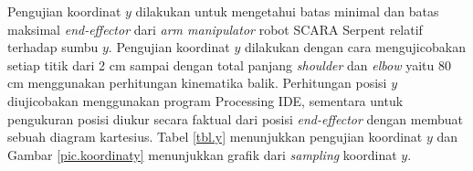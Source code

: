 Pengujian koordinat $y$ dilakukan untuk mengetahui batas minimal dan batas maksimal \textit{end-effector} dari \textit{arm manipulator} robot SCARA Serpent relatif terhadap sumbu $y$. Pengujian koordinat $y$ dilakukan dengan cara mengujicobakan setiap titik dari 2 cm sampai dengan total panjang \textit{shoulder} dan \textit{elbow} yaitu 80 cm menggunakan perhitungan kinematika balik. Perhitungan posisi $y$ diujicobakan menggunakan program Processing IDE, sementara untuk pengukuran posisi diukur secara faktual dari posisi \textit{end-effector} dengan membuat sebuah diagram kartesius. Tabel \ref{tbl.y} menunjukkan pengujian koordinat $y$ dan Gambar \ref{pic.koordinaty} menunjukkan grafik dari \textit{sampling} koordinat $y$.
\fontsize{8}{10}\selectfont
